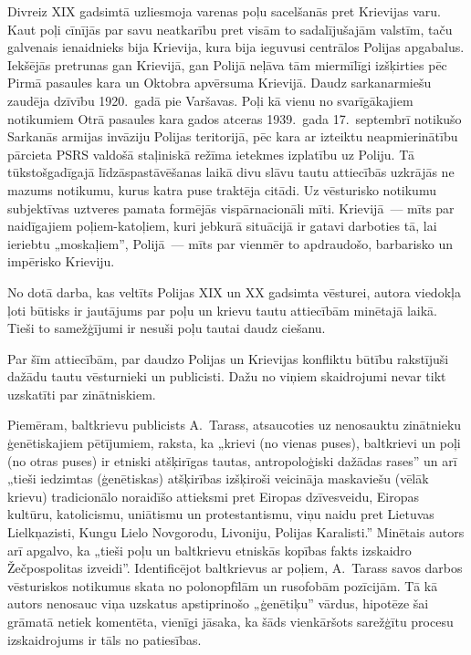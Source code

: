 \documentclass[twoside,a5paper,12pt,fleqn,openany]{extbook}
\begin{document}
Divreiz XIX gadsimtā uzliesmoja varenas poļu sacelšanās pret Krievijas varu. Kaut poļi cīnījās par savu neatkarību pret visām to sadalījušajām valstīm, taču galvenais ienaidnieks bija Krievija, kura bija ieguvusi centrālos Polijas apgabalus. Iekšējās pretrunas gan Krievijā, gan Polijā neļāva tām miermīlīgi izšķirties pēc Pirmā pasaules kara un Oktobra apvērsuma Krievijā. Daudz sarkanarmiešu zaudēja dzīvību 1920.~gadā pie Varšavas. Poļi kā vienu no svarīgākajiem notikumiem Otrā pasaules kara gados atceras 1939.~gada 17.~septembrī notikušo Sarkanās armijas invāziju Polijas teritorijā, pēc kara ar izteiktu neapmierinātību pārcieta PSRS valdošā staļiniskā režīma ietekmes izplatību uz Poliju. Tā tūkstošgadīgajā līdzāspastāvēšanas laikā divu slāvu tautu attiecībās uzkrājās ne mazums notikumu, kurus katra puse traktēja citādi. Uz vēsturisko notikumu subjektīvas uztveres pamata formējās vispārnacionāli mīti. Krievijā~--- mīts par naidīgajiem poļiem-katoļiem, kuri jebkurā situācijā ir gatavi darboties tā, lai ieriebtu „moskaļiem”, Polijā~--- mīts par vienmēr to apdraudošo, barbarisko un impērisko Krieviju.

No dotā darba, kas veltīts Polijas XIX un XX gadsimta vēsturei, autora viedokļa ļoti būtisks ir jautājums par poļu un krievu tautu attiecībām minētajā laikā. Tieši to samežģījumi ir nesuši poļu tautai daudz ciešanu.

Par šīm attiecībām, par daudzo Polijas un Krievijas konfliktu būtību rakstījuši dažādu tautu vēsturnieki un publicisti. Dažu no viņiem skaidrojumi nevar tikt uzskatīti par zinātniskiem.

Piemēram, baltkrievu publicists A.~Tarass, atsaucoties uz nenosauktu zinātnieku ģenētiskajiem pētījumiem, raksta, ka „krievi (no vienas puses), baltkrievi un poļi (no otras puses) ir etniski atšķirīgas tautas, antropoloģiski dažādas rases” un arī „tieši iedzimtas (ģenētiskas) atšķirības izšķiroši veicināja maskaviešu (vēlāk krievu) tradicionālo noraidīšo attieksmi pret Eiropas dzīvesveidu, Eiropas kultūru, katolicismu, uniātismu un protestantismu, viņu naidu pret Lietuvas Lielkņazisti, Kungu Lielo Novgorodu, Livoniju, Polijas Karalisti.” Minētais autors arī apgalvo, ka „tieši poļu un baltkrievu etniskās kopības fakts izskaidro Žečpospolitas izveidi”. Identificējot baltkrievus ar poļiem, A.~Tarass savos darbos vēsturiskos notikumus skata no polonopfīlām un rusofobām pozīcijām. Tā kā autors nenosauc viņa uzskatus apstiprinošo „ģenētiķu” vārdus, hipotēze šai grāmatā netiek komentēta, vienīgi jāsaka, ka šāds vienkāršots sarežģītu procesu izskaidrojums ir tāls no patiesības.
\end{document}
